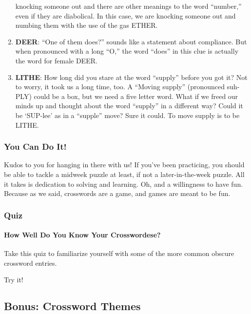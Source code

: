 \begin{enumerate}
  knocking someone out and there are other meanings to the word
  ``number,'' even if they are diabolical. In this case, we are knocking
  someone out and numbing them with the use of the gas ETHER.
\item
  \textbf{DEER}: ``One of them does?'' sounds like a statement about
  compliance. But when pronounced with a long ``O,'' the word ``does''
  in this clue is actually the word for female DEER.
\item
  \textbf{LITHE}: How long did you stare at the word ``supply'' before
  you got it? Not to worry, it took us a long time, too. A ``Moving
  supply'' (pronounced suh-PLY) could be a box, but we need a five
  letter word. What if we freed our minds up and thought about the word
  ``supply'' in a different way? Could it be `SUP-lee' as in a
  ``supple'' move? Sure it could. To move supply is to be LITHE.
\end{enumerate}

\hypertarget{you-can-do-it}{%
\subsubsection{You Can Do It!}\label{you-can-do-it}}

Kudos to you for hanging in there with us! If you've been practicing,
you should be able to tackle a midweek puzzle at least, if not a
later-in-the-week puzzle. All it takes is dedication to solving and
learning. Oh, and a willingness to have fun. Because as we said,
crosswords are a game, and games are meant to be fun.

\hypertarget{quiz}{%
\subsubsection{Quiz}\label{quiz}}

\href{https://www.nytimes.com/interactive/2017/11/28/crosswords/crosswordese-quiz.html?_r=0}{}

\hypertarget{how-well-do-you-know-your-crosswordese}{%
\paragraph{How Well Do You Know Your
Crosswordese?}\label{how-well-do-you-know-your-crosswordese}}

Take this quiz to familiarize yourself with some of the more common
obscure crossword entries.

Try it!

\hypertarget{bonus-crossword-themes}{%
\subsection{Bonus: Crossword Themes}\label{bonus-crossword-themes}}

